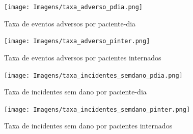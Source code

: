 \documentclass[
  a4paper]{article}
\begin{document}
\begin{figure}[H]
\caption{Taxa de eventos adversos por paciente-dia}
\texttt{[image: Imagens/taxa\_adverso\_pdia.png]}
\end{figure}

\begin{figure}[H]
\caption{Taxa de eventos adversos por pacientes internados}
\texttt{[image: Imagens/taxa\_adverso\_pinter.png]}
\end{figure}

\begin{figure}[H]
\caption{Taxa de incidentes sem dano por paciente-dia}
\texttt{[image: Imagens/taxa\_incidentes\_semdano\_pdia.png]}
\end{figure}

\begin{figure}[H]
\caption{Taxa de incidentes sem dano por pacientes internados}
\texttt{[image: Imagens/taxa\_incidentes\_semdano\_pinter.png]}
\end{figure}
\end{document}
